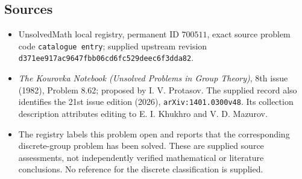 \documentclass[11pt]{article}
\begin{document}
\subsection{Sources}
\begin{itemize}
\item UnsolvedMath local registry, permanent ID \(700511\), exact source problem code \texttt{catalogue entry}; supplied upstream revision \texttt{d371ee917ac9647fbb06cd6fc529deec6f3dda82}.
\item \emph{The Kourovka Notebook (Unsolved Problems in Group Theory)}, 8th issue (1982), Problem 8.62; proposed by I. V. Protasov. The supplied record also identifies the 21st issue edition (2026), \texttt{arXiv:1401.0300v48}. Its collection description attributes editing to E. I. Khukhro and V. D. Mazurov.
\item The registry labels this problem open and reports that the corresponding discrete-group problem has been solved. These are supplied source assessments, not independently verified mathematical or literature conclusions. No reference for the discrete classification is supplied.
\end{itemize}
\end{document}
